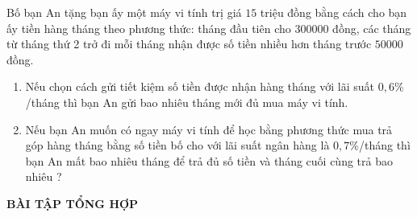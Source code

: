 \begin{bt}%
	Bố bạn An tặng bạn ấy một máy vi tính trị giá $15$ triệu đồng bằng cách cho bạn ấy tiền hàng tháng theo phương thức: tháng đầu tiên cho $300000$ đồng, các tháng từ tháng thứ 2 trở đi mỗi tháng nhận được số tiền nhiều hơn tháng trước $50000$ đồng.
	
	\begin{enumerate}
		\item Nếu chọn cách gửi tiết kiệm số tiền được nhận hàng tháng với lãi suất $0,6\%$/tháng thì bạn An gửi bao nhiêu tháng mới đủ mua máy vi tính.
		
		\item Nếu bạn An muốn có ngay máy vi tính để học bằng phương thức mua trả góp hàng tháng bằng số tiền bố cho với lãi suất ngân hàng là $0,7\%$/tháng thì bạn An mất bao nhiêu tháng để trả đủ số tiền và tháng cuối cùng trả bao nhiêu ?
	\end{enumerate}
\end{bt}
\newpage
\begin{center}
	\textbf{BÀI TẬP TỔNG HỢP}
\end{center}
